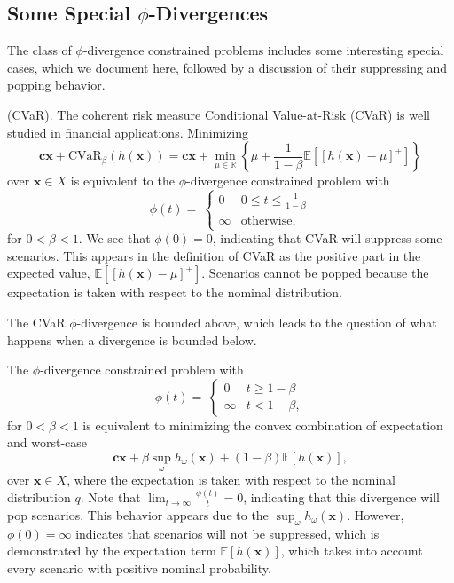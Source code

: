 \documentclass[ijoc,letterpaper]{informs3} %
\newcommand{\R}{{\mathbb{R}}}
\newcommand{\E}{\mathbb{E}}
\newcommand{\e}[1]{\E \left[ #1 \right]}
\newcommand{\x}{\mathbf{x}}
\renewcommand{\c}{\mathbf{c}}
\begin{document}
\subsection{Some Special $\phi$-Divergences}
\label{ssec:special_phi}

The class of $\phi$-divergence constrained problems includes some interesting special cases, which we document here, followed by a discussion of their suppressing and popping behavior.

\begin{example}{(CVaR).}
	The coherent risk measure Conditional Value-at-Risk (CVaR) is well studied in financial applications.
	Minimizing
	\[
		\c\x + \text{CVaR}_\beta(h(\x)) = \c\x + \min_{\mu \in \R} \left\{ \mu + \frac{1}{1-\beta}\e{\left[h(\x)-\mu\right]^+} \right\}
	\]
	over $\x \in X$ is equivalent to the $\phi$-divergence constrained problem with
	\[
		\phi(t) = \
		\begin{cases}
			0 & 0 \leq t \leq \frac{1}{1-\beta} \\
			\infty & \text{otherwise},
		\end{cases}
	\]
	for $0 < \beta < 1$.
	We see that $\phi(0) = 0$, indicating that CVaR will suppress some scenarios.
	This appears in the definition of CVaR as the positive part in the expected value, $\e{[h(\x)-\mu]^+}$.
	Scenarios cannot be popped because the expectation is taken with respect to the nominal distribution.
\end{example}

The CVaR $\phi$-divergence is bounded above, which leads to the question of what happens when a divergence is bounded below.
\begin{example}
	The $\phi$-divergence constrained problem with
	\[
		\phi(t) = \
		\begin{cases}
			0 & t \geq 1-\beta \\
			\infty & t < 1-\beta,
		\end{cases}
	\]
	for $0 < \beta < 1$ is equivalent to minimizing the convex combination of expectation and worst-case
	\[
		\c\x + \beta \sup_\omega h_\omega(\x) + (1-\beta)\e{h(\x)},
	\]
	over $\x \in X$, where the expectation is taken with respect to the nominal distribution $q$.
	Note that $\lim_{t \rightarrow \infty} \frac{\phi(t)}{t} = 0$, indicating that this divergence will pop scenarios.
	This behavior appears due to the $\sup_\omega h_\omega(\x)$.
	However, $\phi(0) = \infty$ indicates that scenarios will not be suppressed, which is demonstrated by the expectation term $\e{h(\x)}$, which takes into account every scenario with positive nominal probability.
\end{example}
\end{document}
